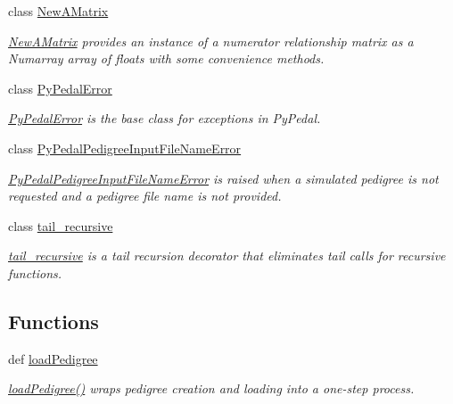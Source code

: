 \begin{CompactItemize}
class \hyperlink{classPyPedal_1_1pyp__newclasses_1_1NewAMatrix}{New\-AMatrix}
\begin{CompactList}\small\item\em \hyperlink{classPyPedal_1_1pyp__newclasses_1_1NewAMatrix}{New\-AMatrix} provides an instance of a numerator relationship matrix as a Numarray array of floats with some convenience methods. \item\end{CompactList}\item 
class \hyperlink{classPyPedal_1_1pyp__newclasses_1_1PyPedalError}{Py\-Pedal\-Error}
\begin{CompactList}\small\item\em \hyperlink{classPyPedal_1_1pyp__newclasses_1_1PyPedalError}{Py\-Pedal\-Error} is the base class for exceptions in Py\-Pedal. \item\end{CompactList}\item 
class \hyperlink{classPyPedal_1_1pyp__newclasses_1_1PyPedalPedigreeInputFileNameError}{Py\-Pedal\-Pedigree\-Input\-File\-Name\-Error}
\begin{CompactList}\small\item\em \hyperlink{classPyPedal_1_1pyp__newclasses_1_1PyPedalPedigreeInputFileNameError}{Py\-Pedal\-Pedigree\-Input\-File\-Name\-Error} is raised when a simulated pedigree is not requested and a pedigree file name is not provided. \item\end{CompactList}\item 
class \hyperlink{classPyPedal_1_1pyp__newclasses_1_1tail__recursive}{tail\_\-recursive}
\begin{CompactList}\small\item\em \hyperlink{classPyPedal_1_1pyp__newclasses_1_1tail__recursive}{tail\_\-recursive} is a tail recursion decorator that eliminates tail calls for recursive functions. \item\end{CompactList}\end{CompactItemize}
\subsection*{Functions}
\begin{CompactItemize}
\item 
def \hyperlink{namespacePyPedal_1_1pyp__newclasses_35a47ad1c56cecbe403dfa79c4bacb35}{load\-Pedigree}
\begin{CompactList}\small\item\em \hyperlink{namespacePyPedal_1_1pyp__newclasses_35a47ad1c56cecbe403dfa79c4bacb35}{load\-Pedigree()} wraps pedigree creation and loading into a one-step process. \item\end{CompactList}\end{CompactItemize}



